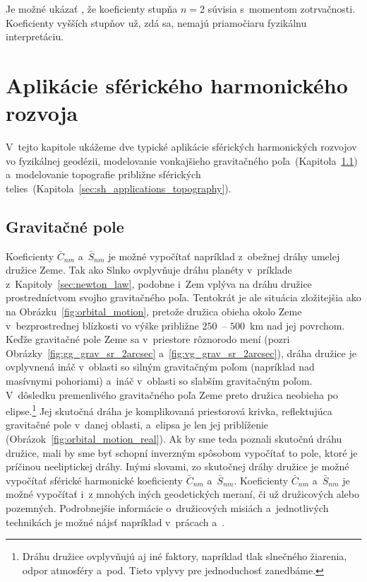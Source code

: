 \documentclass[a4paper,12pt]{book}
\begin{document}
Je možné ukázať \parencite[napríklad][]{MoritzPhysicalGeodesy}, že koeficienty
stupňa $n = 2$ súvisia s~momentom zotrvačnosti.  Koeficienty vyšších stupňov
už, zdá sa, nemajú priamočiaru fyzikálnu interpretáciu.







\section{Aplikácie sférického harmonického rozvoja}
\label{sec:spherical_harmonics_applications}

V~tejto kapitole ukážeme dve typické aplikácie sférických harmonických rozvojov 
vo fyzikálnej geodézii, modelovanie vonkajšieho gravitačného 
poľa~(Kapitola~\ref{sec:sh_applications_gravity_field})
a~modelovanie topografie približne sférických 
telies~(Kapitola~\ref{sec:sh_applications_topography}).

\subsection{Gravitačné pole}
\label{sec:sh_applications_gravity_field}

Koeficienty $\bar{C}_{nm}$ a~$\bar{S}_{nm}$ je možné vypočítať napríklad
z~obežnej dráhy umelej družice Zeme.  Tak ako Slnko ovplyvňuje dráhu planéty
v~príklade z~Kapitoly~\ref{sec:newton_law}, podobne i~Zem vplýva na dráhu
družice prostredníctvom svojho gravitačného poľa.  Tentokrát je ale situácia
zložitejšia ako na Obrázku~\ref{fig:orbital_motion}, pretože družica obieha
okolo Zeme v~bezprostrednej blízkosti vo výške približne $250$~-- $500$~km nad
jej povrchom.  Keďže gravitačné pole Zeme sa v~priestore rôznorodo mení (pozri
Obrázky~\ref{fig:gg_grav_sr_2arcsec} a~\ref{fig:vg_grav_sr_2arcsec}), dráha
družice je ovplyvnená ináč v~oblasti so silným gravitačným poľom (napríklad nad
masívnymi pohoriami) a~ináč v~oblasti so slabším gravitačným poľom.  V~dôsledku
premenlivého gravitačného poľa Zeme preto družica neobieha po
elipse.\footnote{Dráhu družice ovplyvňujú aj iné faktory, napríklad tlak
slnečného žiarenia, odpor atmosféry a~pod.  Tieto vplyvy pre jednoduchosť
zanedbáme.}  Jej skutočná dráha je komplikovaná priestorová krivka,
reflektujúca gravitačné pole v~danej oblasti, a~elipsa je len jej priblíženie
(Obrázok~\ref{fig:orbital_motion_real}).  Ak by sme teda poznali skutočnú dráhu
družice, mali by sme byť schopní inverzným spôsobom vypočítať to pole, ktoré je
príčinou neeliptickej dráhy.  Inými slovami, zo skutočnej dráhy družice je
možné vypočítať sférické harmonické koeficienty $\bar{C}_{nm}$
a~$\bar{S}_{nm}$.  Koeficienty $\bar{C}_{nm}$ a~$\bar{S}_{nm}$ je možné
vypočítať i~z mnohých iných geodetických meraní, či už družicových alebo
pozemných.  Podrobnejšie informácie o~družicových misiách a~jednotlivých
technikách je možné nájsť napríklad v~prácach \textcite{SeeberSatelliteGeodesy}
a~\textcite{MoritzPhysicalGeodesy}.
\end{document}
